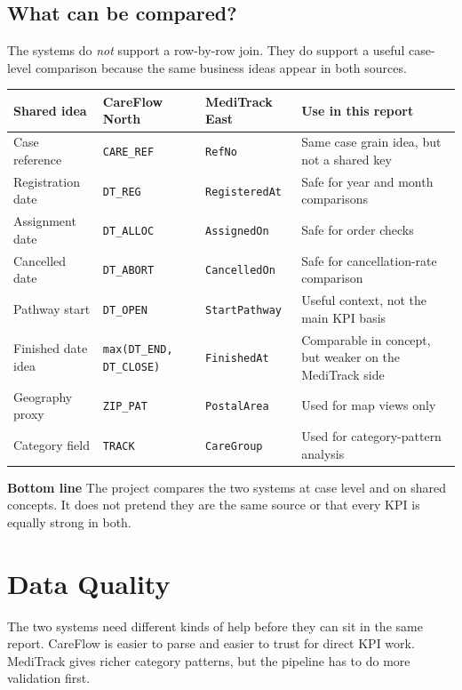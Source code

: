 \documentclass[11pt,a4paper]{article}
\begin{document}
\subsection{What can be compared?}

The systems do \emph{not} support a row-by-row join. They do support a useful case-level comparison because the same business ideas appear in both sources.

\renewcommand{\arraystretch}{1.18}
\begin{tabularx}{\textwidth}{p{4.2cm}p{3.0cm}p{3.0cm}X}
\toprule
Shared idea & CareFlow North & MediTrack East & Use in this report \\
\midrule
Case reference & \texttt{CARE\_REF} & \texttt{RefNo} & Same case grain idea, but not a shared key \\
Registration date & \texttt{DT\_REG} & \texttt{RegisteredAt} & Safe for year and month comparisons \\
Assignment date & \texttt{DT\_ALLOC} & \texttt{AssignedOn} & Safe for order checks \\
Cancelled date & \texttt{DT\_ABORT} & \texttt{CancelledOn} & Safe for cancellation-rate comparison \\
Pathway start & \texttt{DT\_OPEN} & \texttt{StartPathway} & Useful context, not the main KPI basis \\
Finished date idea & \texttt{max(DT\_END, DT\_CLOSE)} & \texttt{FinishedAt} & Comparable in concept, but weaker on the MediTrack side \\
Geography proxy & \texttt{ZIP\_PAT} & \texttt{PostalArea} & Used for map views only \\
Category field & \texttt{TRACK} & \texttt{CareGroup} & Used for category-pattern analysis \\
\bottomrule
\end{tabularx}

\begin{notebox}
\textbf{Bottom line} The project compares the two systems at case level and on shared concepts. It does not pretend they are the same source or that every KPI is equally strong in both.
\end{notebox}

\section{Data Quality}

The two systems need different kinds of help before they can sit in the same report. CareFlow is easier to parse and easier to trust for direct KPI work. MediTrack gives richer category patterns, but the pipeline has to do more validation first.
\end{document}
